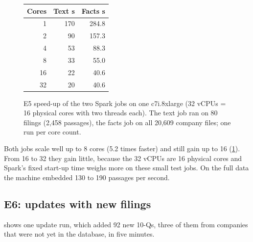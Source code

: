 \begin{figure}[ht]
\centering
{}
\hspace{4mm}
\begin{minipage}[b]{0.3\linewidth}\small
\begin{tabular}{rrr}
\toprule
Cores & Text s & Facts s \\
\midrule
1 & 170 & 284.8 \\
2 & 90 & 157.3 \\
4 & 53 & 88.3 \\
8 & 33 & 55.0 \\
16 & 22 & 40.6 \\
32 & 20 & 40.6 \\
\bottomrule
\end{tabular}
\vspace{6mm}
\end{minipage}
\caption{E5 speed-up of the two Spark jobs on one c7i.8xlarge (32 vCPUs = 16 physical cores with
two threads each). The text job ran on 80 filings (2,458 passages), the facts job on all 20,609
company files; one run per core count.}
\label{fig:e5}
\end{figure}

Both jobs scale well up to 8 cores (5.2 times faster) and still gain up to 16 (\cref{fig:e5}). From 16
to 32 they gain little, because the 32 vCPUs are 16 physical cores and Spark's fixed start-up time
weighs more on these small test jobs. On the full data the machine embedded 130 to 190 passages per
second.

\subsection{E6: updates with new filings}
\label{sec:e6}

 shows one update run, which added 92 new 10-Qs, three of them from companies that were
not yet in the database, in five minutes.

